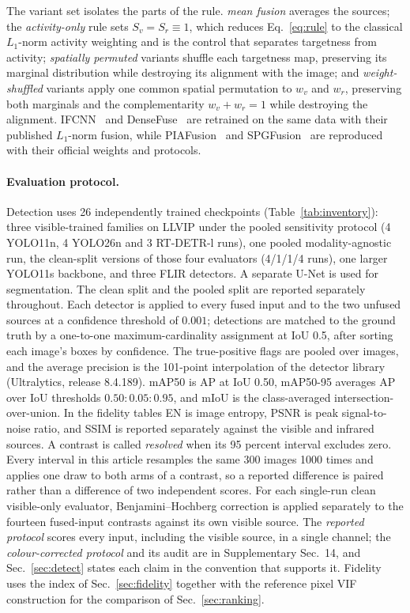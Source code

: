 \documentclass[journal]{IEEEtran}
\begin{document}
\begin{sloppypar}
The variant set isolates the parts of the rule. \emph{mean fusion} averages the
sources; the \emph{activity-only} rule sets $S_v=S_r\equiv1$, which reduces
Eq.~\eqref{eq:rule} to the classical $L_1$-norm activity weighting and is the control
that separates targetness from activity; \emph{spatially permuted} variants shuffle
each targetness map, preserving its marginal distribution while destroying its
alignment with the image; and \emph{weight-shuffled} variants apply one common spatial
permutation to $w_v$ and $w_r$, preserving both marginals and the complementarity
$w_v+w_r=1$ while destroying the alignment. IFCNN~\cite{zhang2020} and
DenseFuse~\cite{li2019} are retrained on the same data with their published
$L_1$-norm fusion, while PIAFusion~\cite{tang2022} and SPGFusion~\cite{zhang2026} are
reproduced with their official weights and protocols.
\end{sloppypar}

\paragraph{Evaluation protocol.} Detection uses 26 independently trained checkpoints
(Table~\ref{tab:inventory}): three visible-trained families on LLVIP under the pooled
sensitivity protocol (4 YOLO11n, 4 YOLO26n and 3 RT-DETR-l runs), one pooled
modality-agnostic run, the clean-split versions of those four evaluators
(4/1/1/4 runs), one larger YOLO11s backbone, and three FLIR detectors. A separate U-Net
is used for segmentation. The clean split and the pooled split are reported separately
throughout.
Each detector is applied to every fused input and to the two unfused sources at a
confidence threshold of $0.001$; detections are matched to
the ground truth by a one-to-one maximum-cardinality assignment at IoU 0.5, after sorting
each image's boxes by confidence. The true-positive flags are pooled over images, and the
average precision is the 101-point interpolation of the detector library (Ultralytics,
release 8.4.189). mAP50 is AP at IoU 0.50, mAP50-95 averages AP over IoU thresholds
$0.50{:}0.05{:}0.95$, and mIoU is the class-averaged intersection-over-union. In the
fidelity tables EN is image entropy, PSNR is peak signal-to-noise ratio, and SSIM is
reported separately against the visible and infrared sources. A contrast is called
\emph{resolved} when its 95 percent interval excludes zero. Every interval in this article resamples the same 300 images
1000 times and applies one draw to both arms of a contrast, so a reported difference
is paired rather than a difference of two independent scores. For each single-run
clean visible-only evaluator, Benjamini--Hochberg correction is applied separately to
the fourteen fused-input contrasts against its own visible source. The
\emph{reported protocol} scores every input, including the visible source, in a single
channel; the \emph{colour-corrected protocol} and its audit are in
Supplementary Sec.~14, and Sec.~\ref{sec:detect} states each claim in the convention
that supports it. Fidelity uses the index of Sec.~\ref{sec:fidelity} together with the
reference pixel VIF construction for the comparison of Sec.~\ref{sec:ranking}.
\end{document}
